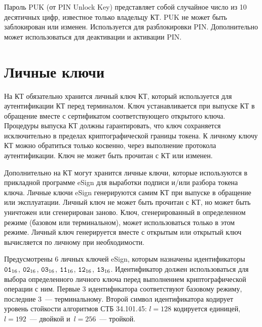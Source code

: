 Пароль PUK (от PIN Unlock Key) представляет собой случайное число из 10 
десятичных цифр, известное только владельцу КТ. PUK не может быть заблокирован 
или изменен. Используется для разблокировки PIN. Дополнительно может использоваться 
для деактивации и активации PIN.

\section{Личные ключи}\label{OBJ.Keys}

На КТ обязательно хранится личный ключ КТ, который используется 
для аутентификации КТ перед терминалом. Ключ устанавливается при выпуске
КТ в обращение вместе с сертификатом соответствующего открытого ключа. 
Процедуры выпуска КТ должны гарантировать, что ключ сохраняется исключительно 
в пределах криптографической границы токена. К личному ключу КТ можно 
обратиться только косвенно, через выполнение протокола аутентификации. Ключ не 
может быть прочитан с КТ или изменен. 

Дополнительно на КТ могут хранится личные ключи, 
которые используются в прикладной программе eSign для выработки 
подписи и/или разбора токена ключа. Личные ключи eSign генерируются самим КТ 
при выпуске в обращение или эксплуатации. Личный ключ не может быть прочитан с КТ, 
но может быть уничтожен или сгенерирован заново. Ключ, сгенерированный в 
определенном режиме (базовом или терминальном), может использоваться только в 
этом режиме. Личный ключ генерируется вместе с открытым или открытый ключ 
вычисляется по личному при необходимости.

Предусмотрены 6 личных ключей eSign, которым назначены идентификаторы 
$\texttt{01}_{16}$, $\texttt{02}_{16}$, $\texttt{03}_{16}$, $\texttt{11}_{16}$, $\texttt{12}_{16}$, $\texttt{13}_{16}$.
%
Идентификатор должен использоваться для выбора определенного личного ключа 
перед выполнением криптографической операции с ним.
%
Первые 3 идентификатора соответствуют базовому режиму, последние 3~--- 
терминальному. Второй символ идентификатора кодирует уровень стойкости
алгоритмов СТБ 34.101.45: $l=128$ кодируется единицей, 
$l=192$~--- двойкой и~$l=256$~--- тройкой.

